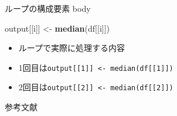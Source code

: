 \documentclass[ignorenonframetext,]{beamer}
\newenvironment{Shaded}{\begin{snugshade}}{\end{snugshade}}
\newcommand{\KeywordTok}[1]{\textcolor[rgb]{0.13,0.29,0.53}{\textbf{#1}}}
\newcommand{\StringTok}[1]{\textcolor[rgb]{0.31,0.60,0.02}{#1}}
\newcommand{\NormalTok}[1]{#1}
\providecommand{\tightlist}{%
  \setlength{\itemsep}{0pt}\setlength{\parskip}{0pt}}
\begin{document}
\begin{frame}[fragile]{ループの構成要素 body}

\begin{Shaded}
\begin{Highlighting}[]
\NormalTok{output[[i]] <-}\StringTok{ }\KeywordTok{median}\NormalTok{(df[[i]])}
\end{Highlighting}
\end{Shaded}

\begin{itemize}
\tightlist
\item
  ループで実際に処理する内容
\item
  1回目は\texttt{output{[}{[}1{]}{]}\ \textless{}-\ median(df{[}{[}1{]}{]})}
\item
  2回目は\texttt{output{[}{[}2{]}{]}\ \textless{}-\ median(df{[}{[}2{]}{]})}
\end{itemize}

\end{frame}

\begin{frame}{参考文献}

\end{frame}
\end{document}
